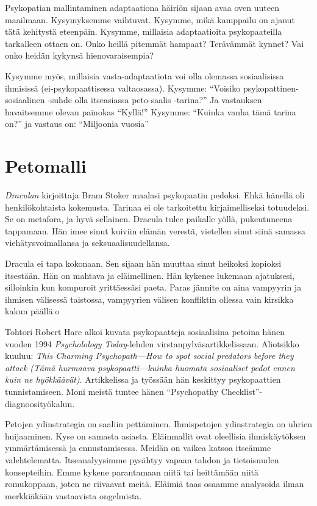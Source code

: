 Psykopatian mallintaminen adaptaationa häiriön sijaan avaa oven uuteen maailmaan. Kysymyksemme vaihtuvat. Kysymme, mikä kamppailu on ajanut tätä kehitystä eteenpäin. Kysymme, millaisia adaptaatioita psykopaateilla tarkalleen ottaen on. Onko heillä pitemmät hampaat? Terävämmät kynnet? Vai onko heidän kykynsä hienovaraisempia?

Kysymme myös, millaisia vasta-adaptaatiota voi olla olemassa sosiaalisissa ihmisissä (ei-psykopaattisessa valtaosassa). Kysymme: ``Voisiko psykopattinen-sosiaalinen -suhde olla itseasiassa peto-saalis -tarina?'' Ja vastauksen havaitsemme olevan painokas ``Kyllä!'' Kysymme: ``Kuinka vanha tämä tarina on?'' ja vastaus on: ``Miljoonia vuosia''

\section{Petomalli}

\emph{Draculan} kirjoittaja Bram Stoker maalasi psykopaatin pedoksi. Ehkä hänellä oli henkilökohtaista kokemusta. Tarinaa ei ole tarkoitettu kirjaimelliseksi totuudeksi. Se on metafora, ja hyvä sellainen. Dracula tulee paikalle yöllä, pukeutuneena tappamaan. Hän imee sinut kuiviin elämän verestä, vietellen sinut siinä samassa viehätysvoimallansa ja seksuaalisuudellansa.

Dracula ei tapa kokonaan. Sen sijaan hän muuttaa sinut heikoksi kopioksi itsestään. Hän on mahtava ja eläimellinen. Hän kykenee lukemaan ajatuksesi, silloinkin kun kompuroit yrittäessäsi paeta. Paras jännite on aina vampyyrin ja ihmisen välisessä taistossa, vampyyrien välisen konfliktin ollessa vain kirsikka kakun päällä.o

Tohtori Robert Hare alkoi kuvata psykopaatteja sosiaalisina petoina hänen vuoden 1994 \emph{Psycholology Today}-lehden virstanpylväsartikkelissaan. Aliotsikko kuuluu: \emph{This Charming Psychopath---How to spot social predators before they attack} \emph{(Tämä hurmaava psykopaatti---kuinka huomata sosiaaliset pedot ennen kuin ne hyökkäävät)}. Artikkelissa ja työssään hän keskittyy psykopaattien tunnistamiseen. Moni meistä tuntee hänen ``Psychopathy Checklist''-diagnoosityökalun.

Petojen ydinstrategia on saaliin pettäminen. Ihmispetojen ydinstrategia on uhrien huijaaminen. Kyse on samasta asiasta. Eläinmallit ovat oleellisia ihmiskäytöksen ymmärtämisessä ja ennustamisessa. Meidän on vaikea katsoa itseämme valehtelematta. Itseanalyysimme pysähtyy vapaan tahdon ja tietoisuuden konsepteihin. Emme kykene parantamaan niitä tai heittämään niitä romukoppaan, joten ne riivaavat meitä. Eläimiä taas osaamme analysoida ilman merkkiäkään vastaavista ongelmista.

